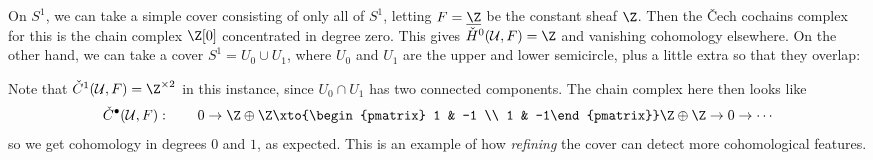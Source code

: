 \documentclass[11pt]{amsart}
\begin{document}
\begin{example}\label{exa:s1-north-south-cech-cohomology} 
On $S^1$, we can take a simple cover consisting of only all of $S^1$, letting $F=\underline{\Z}$ be the constant sheaf $\Z$. Then the \v{C}ech cochains complex for this is the chain complex $\Z[0]$ concentrated in degree zero. This gives $\check{H}^0(\mathcal{U},F) = \Z$ and vanishing cohomology elsewhere. On the other hand, we can take a cover $S^1 = U_0 \cup U_1$, where $U_0$ and $U_1$ are the upper and lower semicircle, plus a little extra so that they overlap:
\begin{figure}[H]
\end{figure}

Note that $\check{C}^1(\mathcal{U},F) = \Z^{\times 2}$ in this instance, since $U_0 \cap U_1$ has two connected components. The chain complex here then looks like
\begin{align*}
    \check{C}^\bullet(\mathcal{U},F) : \quad\quad 0 \to \Z \oplus \Z \xto{\begin{pmatrix} 1 & -1 \\ 1 & -1\end{pmatrix}} \Z \oplus \Z \to 0 \to \cdots
\end{align*}
so we get cohomology in degrees $0$ and $1$, as expected. This is an example of how \emph{refining} the cover can detect more cohomological features.
\end{example}
\end{document}
